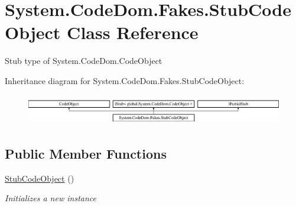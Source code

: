 \hypertarget{class_system_1_1_code_dom_1_1_fakes_1_1_stub_code_object}{\section{System.\-Code\-Dom.\-Fakes.\-Stub\-Code\-Object Class Reference}
\label{class_system_1_1_code_dom_1_1_fakes_1_1_stub_code_object}
}


Stub type of System.\-Code\-Dom.\-Code\-Object 


Inheritance diagram for System.\-Code\-Dom.\-Fakes.\-Stub\-Code\-Object\-:\begin{figure}[H]
\begin{center}
\leavevmode
\includegraphics[height=1.333333cm]{class_system_1_1_code_dom_1_1_fakes_1_1_stub_code_object}
\end{center}
\end{figure}
\subsection*{Public Member Functions}
\begin{DoxyCompactItemize}
\item 
\hyperlink{class_system_1_1_code_dom_1_1_fakes_1_1_stub_code_object_a3291faef07dcbfe7507c37a53230fd1c}{Stub\-Code\-Object} ()
\begin{DoxyCompactList}\small\item\em Initializes a new instance\end{DoxyCompactList}\end{DoxyCompactItemize}

